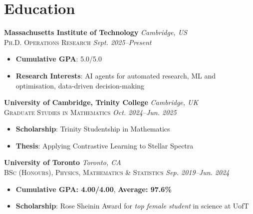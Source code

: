 \documentclass[10pt, letterpaper]{article}
\newenvironment{highlightsforbulletentries}{
    \begin{itemize}[
        topsep=0.05 cm,
        parsep=0.01 cm,
        partopsep=0pt,
        itemsep=0pt,
        leftmargin=10pt
    ]
}{
    \end{itemize}
} %
\newenvironment{onecolentry}{
    \begin{adjustwidth}{
    }{
    }
}{
    \end{adjustwidth}
} %
\newcommand{\lightfont}[1]{{\fontseries{l}\selectfont #1}}
\begin{document}
    \section{Education}
    \begin{onecolentry}
            \textbf{Massachusetts Institute of Technology} \hfill \textit{Cambridge, US}\\
            \textsc{Ph.D. Operations Research}  \hfill \textit{\lightfont{Sept. 2025--Present}}
            \begin{highlightsforbulletentries}
            \item \textbf{Cumulative GPA}: 5.0/5.0
            \item \textbf{Research Interests}: AI agents for automated research, ML and optimisation, data-driven decision-making
            \end{highlightsforbulletentries}
        \end{onecolentry}
\vspace{0.2 cm}
\begin{onecolentry}
    \textbf{University of Cambridge, Trinity College} \hfill \textit{Cambridge, UK}\\
    \textsc{Graduate Studies in Mathematics} \hfill \textit{\lightfont{Oct. 2024--Jun. 2025}}
    \begin{highlightsforbulletentries}
    \item \textbf{Scholarship}: Trinity Studentship in Mathematics
    \item \textbf{Thesis}: Applying Contrastive Learning to Stellar Spectra
    \end{highlightsforbulletentries}
\end{onecolentry}
      \vspace{0.2 cm}
        \begin{onecolentry}
            \textbf{University of Toronto} \hfill \textit{Toronto, CA}\\
            \textsc{BSc (Honours), Physics, Mathematics \& Statistics}  \hfill \textit{\lightfont{Sep. 2019--Jun. 2024}}
             \begin{highlightsforbulletentries}
             \item \textbf{Cumulative GPA: 4.00/4.00}, \textbf{Average: 97.6\%}
             \item \textbf{Scholarship}: Rose Sheinin Award for \textit{top female student} in science at UofT
             \end{highlightsforbulletentries}
        \end{onecolentry}
         \vspace{-0.1cm}
\end{document}
